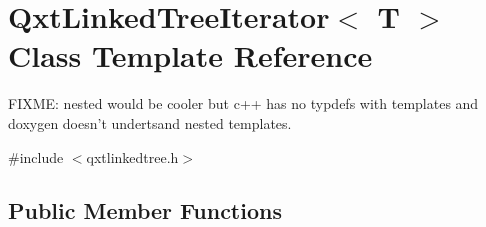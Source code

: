 \hypertarget{class_qxt_linked_tree_iterator}{\section{Qxt\-Linked\-Tree\-Iterator$<$ T $>$ Class Template Reference}
\label{class_qxt_linked_tree_iterator}
}


F\-I\-X\-M\-E\-: nested would be cooler but c++ has no typdefs with templates and doxygen doesn't undertsand nested templates.  




{\ttfamily \#include $<$qxtlinkedtree.\-h$>$}

\subsection*{Public Member Functions}
